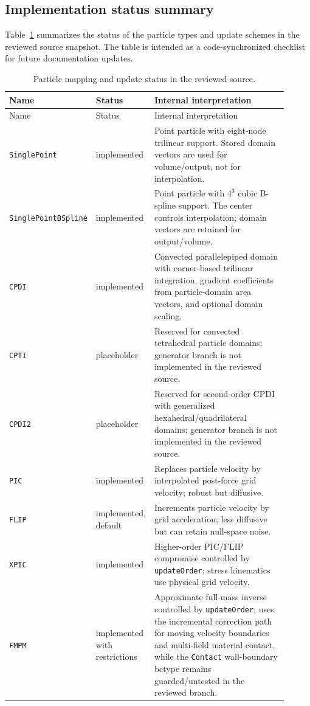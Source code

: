 \subsection{Implementation status summary}
\label{subsec:particle-update-status}

Table~\ref{tab:particle-update-status} summarizes the status of the particle types and update schemes in the reviewed source snapshot.  The table is intended as a code-synchronized checklist for future documentation updates.

\begin{longtable}{p{0.25\linewidth}p{0.18\linewidth}p{0.48\linewidth}}
\caption{Particle mapping and update status in the reviewed source.}\label{tab:particle-update-status}\\
\toprule
Name & Status & Internal interpretation \\
\midrule
\endfirsthead
\toprule
Name & Status & Internal interpretation \\
\midrule
\endhead
\bottomrule
\endfoot
\texttt{SinglePoint} & implemented & Point particle with eight-node trilinear support.  Stored domain vectors are used for volume/output, not for interpolation. \\
\texttt{SinglePointBSpline} & implemented & Point particle with $4^3$ cubic B-spline support.  The center controls interpolation; domain vectors are retained for output/volume. \\
\texttt{CPDI} & implemented & Convected parallelepiped domain with corner-based trilinear integration, gradient coefficients from particle-domain area vectors, and optional domain scaling. \\
\texttt{CPTI} & placeholder & Reserved for convected tetrahedral particle domains; generator branch is not implemented in the reviewed source. \\
\texttt{CPDI2} & placeholder & Reserved for second-order CPDI with generalized hexahedral/quadrilateral domains; generator branch is not implemented in the reviewed source. \\
\texttt{PIC} & implemented & Replaces particle velocity by interpolated post-force grid velocity; robust but diffusive. \\
\texttt{FLIP} & implemented, default & Increments particle velocity by grid acceleration; less diffusive but can retain null-space noise. \\
\texttt{XPIC} & implemented & Higher-order PIC/FLIP compromise controlled by \texttt{updateOrder}; stress kinematics use physical grid velocity. \\
\texttt{FMPM} & implemented with restrictions & Approximate full-mass inverse controlled by \texttt{updateOrder}; uses the incremental correction path for moving velocity boundaries and multi-field material contact, while the \texttt{Contact} wall-boundary bctype remains guarded/untested in the reviewed branch. \\
\end{longtable}
